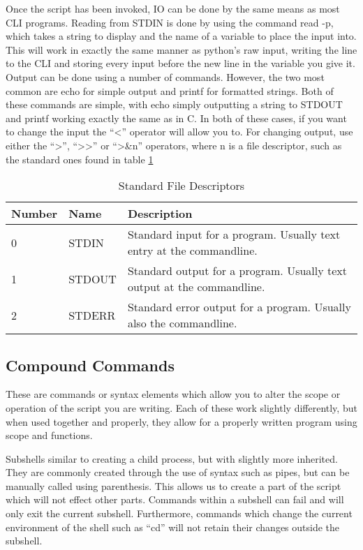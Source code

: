 			Once the script has been invoked, IO can be done by the same means as most CLI programs. 
			Reading from STDIN is done by using the command read -p, which takes a string to display and the name of a variable to place the input into. 
			This will work in exactly the same manner as python's raw input, writing the line to the CLI and storing every input before the new line in the variable you give it. 
			Output can be done using a number of commands. 
			However, the two most common are echo for simple output and printf for formatted strings. 
			Both of these commands are simple, with echo simply outputting a string to STDOUT and printf working exactly the same as in C. 
			In both of these cases, if you want to change the input the ``<'' operator will allow you to. 
			For changing output, use either the ``>'', ``>{}>'' or ``>\&n'' operators, where n is a file descriptor, such as the standard ones found in table \ref{tab:stdFileDescriptors}
			\begin{table}[htb]
				\centering
				\begin{adjustbox}{max width=1\textwidth}
				\begin{tabular}{|l|l|l|}
					\hline
					\textbf{Number} & \textbf{Name} & \textbf{Description} \\ \hline
					0 & STDIN & Standard input for a program. Usually text entry at the commandline. \\ \hline 
					1 & STDOUT & Standard output for a program. Usually text output at the commandline. \\ \hline
					2 & STDERR & Standard error output for a program. Usually also the commandline. \\ \hline
				\end{tabular}
				\end{adjustbox}
				\caption{Standard File Descriptors}
				\label{tab:stdFileDescriptors}
			\end{table}
					
		\subsection{Compound Commands}
			These are commands or syntax elements which allow you to alter the scope or operation of the script you are writing. 
			Each of these work slightly differently, but when used together and properly, they allow for a properly written program using scope and functions. 

			Subshells similar to creating a child process, but with slightly more inherited. 
			They are commonly created through the use of syntax such as pipes, but can be manually called using parenthesis. 
			This allows us to create a part of the script which will not effect other parts. 
			Commands within a subshell can fail and will only exit the current subshell. 
			Furthermore, commands which change the current environment of the shell such as ``cd'' will not retain their changes outside the subshell. 
			

